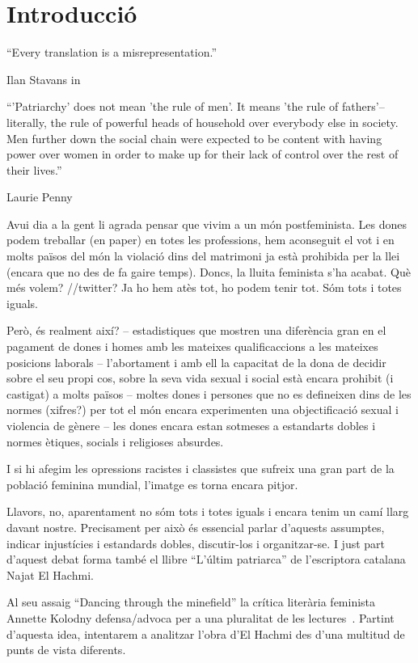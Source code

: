 \section{Introducció}

\epigraph{``Every translation is a misrepresentation.''}{Ilan Stavans in~\autocite{Albin2005}}
\epigraph{``'Patriarchy' does not mean 'the rule of men'. It means 'the rule of fathers'--literally, the rule of powerful heads of household over everybody else in society. Men further down the social chain were expected to be content with having power over women in order to make up for their lack of control over the rest of their lives.''}{Laurie Penny~\autocite[69]{Penny2014}}

Avui dia a la gent li agrada pensar que vivim a un món postfeminista.
Les dones podem treballar (en paper) en totes les professions, hem aconseguit el vot i en molts països del món la violació dins del matrimoni ja està prohibida per la llei (encara que no des de fa gaire temps).
Doncs, la lluita feminista s'ha acabat.
Què més volem?
//twitter?
Ja ho hem atès tot, ho podem tenir tot.
Sóm tots i totes iguals.

Però, és realment així?
-- estadistiques que mostren una diferència gran en el pagament de dones i homes amb les mateixes qualificaccions a les mateixes posicions laborals
-- l'abortament i amb ell la capacitat de la dona de decidir sobre el seu propi cos, sobre la seva vida sexual i social està encara prohibit (i castigat) a molts països
-- moltes dones i persones que no es defineixen dins de les normes (xifres?) per tot el món encara experimenten una objectificació sexual i violencia de gènere
-- les dones encara estan sotmeses a estandarts dobles i normes ètiques, socials i religioses absurdes.

I si hi afegim les opressions racistes i classistes que sufreix una gran part de la població feminina mundial, l'imatge es torna encara pitjor.

Llavors, no, aparentament no sóm tots i totes iguals i encara tenim un camí llarg davant nostre.
Precisament per això és essencial parlar d'aquests assumptes, indicar injustícies i estandards dobles, discutir-los i organitzar-se.
I just part d'aquest debat forma també el llibre ``L'últim patriarca'' de l'escriptora catalana Najat El Hachmi.

Al seu assaig ``Dancing through the minefield'' la crítica literària feminista Annette Kolodny defensa/advoca per a una pluralitat de les lectures~\autocite{Kolodny1980}.
Partint d'aquesta idea, intentarem a analitzar l'obra d'El Hachmi des d'una multitud de punts de vista diferents.

